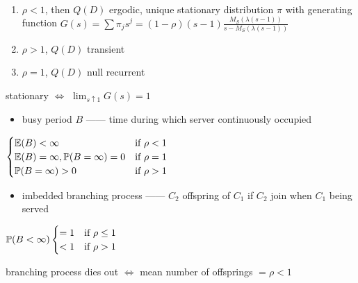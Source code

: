 \begin{thm}\,
    \begin{enumerate}
        \item $\rho < 1$, then $Q(D)$ ergodic, unique stationary distribution $\pi$ with generating function
        $G(s) = \sum \pi_j s^j = (1 - \rho)(s - 1)\frac{M_S(\lambda(s-1))}{s - M_S(\lambda(s - 1))}$
        \item $\rho > 1$, $Q(D)$ transient
        \item $\rho = 1$, $Q(D)$ null recurrent
    \end{enumerate}
\end{thm}
\begin{pf}
    stationary $\iff$ $\lim_{s \uparrow 1}G(s) = 1$
\end{pf}
\begin{itemize}
    \item busy period $B$ ------ time during which server continuously occupied
\end{itemize}

\begin{fact}
    $\begin{cases}
        \mathbb{E}(B)   < \infty & \text{if } \rho < 1\\
        \mathbb{E}(B)   = \infty, \mathbb{P}(B = \infty) = 0 & \text{if } \rho = 1\\
        \mathbb{P}(B = \infty) > 0 & \text{if } \rho > 1\\
    \end{cases}$
\end{fact}

\begin{itemize}
    \item imbedded branching process ------ $C_2$ offspring of $C_1$ if $C_2$ join when $C_1$ being served
\end{itemize}

\begin{thm}
    $\mathbb{P}(B < \infty) \begin{cases}
                         = 1 &\text{if } \rho \leq 1\\
                         < 1 &\text{if } \rho > 1\\
    \end{cases}$
\end{thm}
\begin{pf}
    branching process dies out $\iff$ mean number of offsprings $= \rho < 1$
\end{pf}
